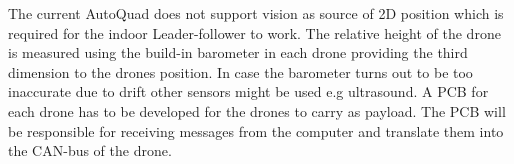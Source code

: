 The current AutoQuad does not support vision as source of 2D position which is required for the indoor Leader-follower to work. The relative height of the drone is measured using the build-in barometer in each drone providing the third dimension to the drones position. In case the barometer turns out to be too inaccurate due to drift other sensors might be used e.g ultrasound. A PCB for each drone has to be developed for the drones to carry as payload. The PCB will be responsible for receiving messages from the computer and translate them into the CAN-bus of the drone.